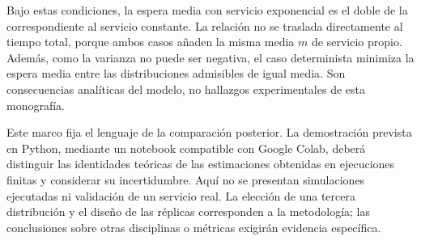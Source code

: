 Bajo estas condiciones, la espera media con servicio exponencial es el doble de la correspondiente al servicio constante. La relación no se traslada directamente al tiempo total, porque ambos casos añaden la misma media $m$ de servicio propio. Además, como la varianza no puede ser negativa, el caso determinista minimiza la espera media entre las distribuciones admisibles de igual media. Son consecuencias analíticas del modelo, no hallazgos experimentales de esta monografía.

Este marco fija el lenguaje de la comparación posterior. La demostración prevista en Python, mediante un notebook compatible con Google Colab, deberá distinguir las identidades teóricas de las estimaciones obtenidas en ejecuciones finitas y considerar su incertidumbre. Aquí no se presentan simulaciones ejecutadas ni validación de un servicio real. La elección de una tercera distribución y el diseño de las réplicas corresponden a la metodología; las conclusiones sobre otras disciplinas o métricas exigirán evidencia específica.
